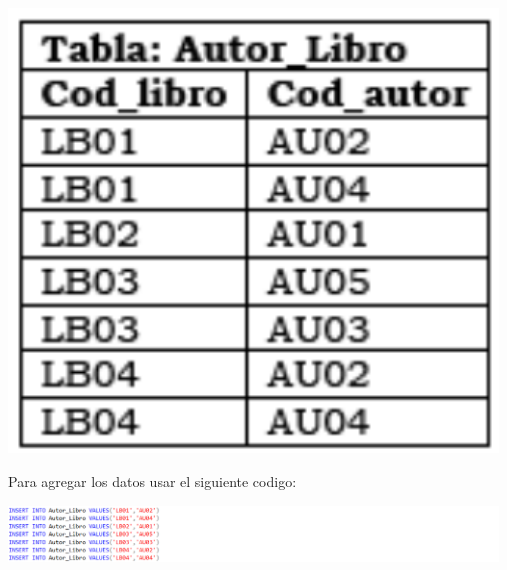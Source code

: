 \documentclass[12pt,letterpaper]{article}
\newcommand\tab[1][1cm]{\hspace*{#1}}
\begin{document}
\begin{enumerate}[\tab 1.]
\begin{itemize}
\begin{center}
                \includegraphics[width=13cm]{./img/img6.png}
            \end{center}
            Para agregar los datos usar el siguiente codigo:
            \begin{center}
                \includegraphics[width=13cm]{./img/img6.1.png}
            \end{center}
        \end{itemize}
    \end{enumerate}
\end{document}
